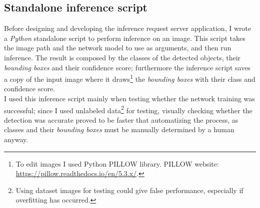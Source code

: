 \subsection{Standalone inference script}
Before designing and developing the inference request server application, I wrote a \emph{Python} standalone script to perform inference on an image. This script takes the image path and the network model to use as arguments, and then run inference. The result is composed by the classes of the detected objects, their \emph{bounding boxes} and their confidence score; furthermore the inference script saves a copy of the input image where it draws\footnote{To edit images I used Python PILLOW library. PILLOW website: \url{https://pillow.readthedocs.io/en/5.3.x/}.} the \emph{bounding boxes} with their class and confidence score. \\
I used this inference script mainly when testing whether the network training was successful; since I used unlabeled data\footnote{Using dataset images for testing could give false performance, especially if overfitting has occurred.} for testing, visually checking whether the detection was accurate proved to be faster that automatizing the process, as classes and their \emph{bounding boxes} must be manually determined by a human anyway.

